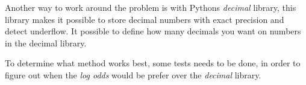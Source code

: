     Another way to work around the problem is with Pythons \textit{decimal} library, this library makes it possible to store decimal numbers with exact precision and detect underflow. It possible to define how many decimals you want on numbers in the decimal library.

To determine what method works best, some tests needs to be done, in order to figure out when the \textit{log odds} would be prefer over the \textit{decimal} library.
